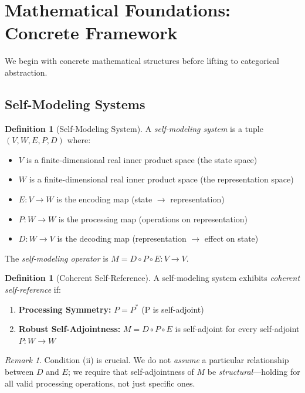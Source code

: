 \documentclass[11pt]{article}
\theoremstyle{definition}
\newtheorem{definition}[theorem]{Definition}
\theoremstyle{remark}
\newtheorem{remark}[theorem]{Remark}
\begin{document}
\section{Mathematical Foundations: Concrete Framework}

We begin with concrete mathematical structures before lifting to categorical abstraction.

\subsection{Self-Modeling Systems}

\begin{definition}[Self-Modeling System]
A \emph{self-modeling system} is a tuple $(V, W, E, P, D)$ where:
\begin{itemize}
    \item $V$ is a finite-dimensional real inner product space (the state space)
    \item $W$ is a finite-dimensional real inner product space (the representation space)
    \item $E : V \to W$ is the encoding map (state $\to$ representation)
    \item $P : W \to W$ is the processing map (operations on representation)
    \item $D : W \to V$ is the decoding map (representation $\to$ effect on state)
\end{itemize}
The \emph{self-modeling operator} is $M = D \circ P \circ E : V \to V$.
\end{definition}

\begin{definition}[Coherent Self-Reference]
A self-modeling system exhibits \emph{coherent self-reference} if:
\begin{enumerate}[label=(\roman*)]
    \item \textbf{Processing Symmetry:} $P = P^*$ (P is self-adjoint)
    \item \textbf{Robust Self-Adjointness:} $M = D \circ P \circ E$ is self-adjoint for every self-adjoint $P : W \to W$
\end{enumerate}
\end{definition}

\begin{remark}
Condition (ii) is crucial. We do not \emph{assume} a particular relationship between $D$ and $E$; we require that self-adjointness of $M$ be \emph{structural}---holding for all valid processing operations, not just specific ones.
\end{remark}
\end{document}
